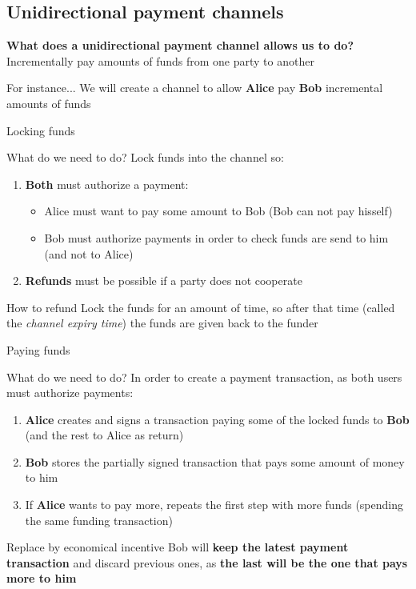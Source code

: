 \documentclass{beamer}
\begin{document}
\subsection{Unidirectional payment channels}
\begin{frame}
 \begin{center}
  \textbf{What does a unidirectional payment channel allows us to do?}\\
  Incrementally pay amounts of funds from one party to another
 \end{center}
 \begin{exampleblock}{For instance...}
  We will create a channel to allow \textbf{Alice} pay \textbf{Bob} incremental amounts of funds
 \end{exampleblock}
\end{frame}
\begin{frame}{Locking funds}
 \begin{block}{What do we need to do?}
  Lock funds into the channel so:
  \begin{enumerate}
   \item \textbf{Both} must authorize a payment:
         \begin{itemize}
          \item Alice must want to pay some amount to Bob (Bob can not pay hisself)
          \item Bob must authorize payments in order to check funds are send to him (and not to Alice)
         \end{itemize}
   \item \textbf{Refunds} must be possible if a party does not cooperate
  \end{enumerate}
 \end{block}
 \begin{block}{How to refund}
  Lock the funds for an amount of time, so after that time (called the \textit{channel expiry time}) the funds are given back to the funder
 \end{block}
\end{frame}
\begin{frame}{Paying funds}
 \begin{block}{What do we need to do?}
  In order to create a payment transaction, as both users must authorize payments:
  \begin{enumerate}
   \item \textbf{Alice} creates and signs a transaction paying some of the locked funds to \textbf{Bob} (and the rest to Alice as return)
   \item \textbf{Bob} stores the partially signed transaction that pays some amount of money to him
   \item If \textbf{Alice} wants to pay more, repeats the first step with more funds (spending the same funding transaction)
  \end{enumerate}
 \end{block}
 \begin{block}{Replace by economical incentive}
  Bob will \textbf{keep the latest payment transaction} and discard previous ones, as \textbf{the last will be the one that pays more to him}
 \end{block}
\end{frame}
\end{document}
